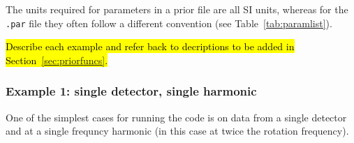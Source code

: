 The units required for parameters in a prior file are all SI units, whereas for the {\tt .par} file they often follow a different
convention (see Table~\ref{tab:paramlist}).

\hl{Describe each example and refer back to decriptions to be added in Section~\ref{sec:priorfuncs}.}

\subsubsection{Example 1: single detector, single harmonic}

One of the simplest cases for running the code is on data from a single detector and at a single frequncy harmonic (in this
case at twice the rotation frequency).
